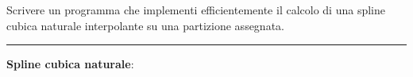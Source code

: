 Scrivere un programma che implementi efficientemente il calcolo di una spline cubica naturale interpolante su una partizione assegnata.

\hspace*{\fill}
\par\noindent\rule{\textwidth}{0.4pt}
\hspace*{\fill}

\textbf{Spline cubica naturale}:

